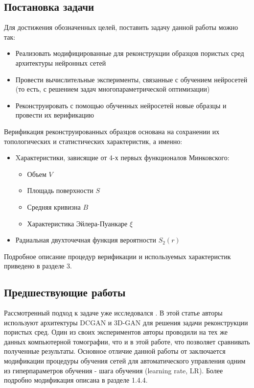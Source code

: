 	\subsection*{Постановка задачи}
	
	Для достижения обозначенных целей, поставить задачу данной работы можно так:
	
	\begin{itemize}
		\item Реализовать модифицированные для реконструкции образцов пористых сред архитектуры нейронных сетей
		\item Провести вычислительные эксперименты, связанные с обучением нейросетей (то есть, с решением задач многопараметрической оптимизации)
		\item Реконструировать с помощью обученных нейросетей новые образцы и провести их верификацию
	\end{itemize}

	Верификация реконструированных образцов основана на сохранении их топологических и статистических характеристик, а именно:
	
	\begin{itemize}
		\item Xарактеристики, зависящие от 4-х первых функционалов Минковского:
		\begin{itemize}
			\item Объем $V$
			\item Площадь поверхности $S$
			\item Средняя кривизна $B$
			\item Характеристика Эйлера-Пуанкаре $\xi$
		\end{itemize}
		\item Радиальная двухточечная функция вероятности $S_2(r)$
	\end{itemize}

	Подробное описание процедур верификации и используемых характеристик приведено в разделе 3.
	
	\subsection*{Предшествующие работы}
		Рассмотренный подход к задаче уже исследовался \cite{Mosser}. В этой статье авторы используют архитектуры DCGAN \cite{Radford} и 3D-GAN \cite{Wu} для решения задачи реконструкции пористых сред. Один из своих экспериментов авторы проводили на тех же данных компьютерной томографии, что и в этой работе, что позволяет сравнивать полученные результаты. Основное отличие данной работы от \cite{Mosser} заключается модификации процедуры обучения сетей для автоматического управления одним из гиперпараметров обучения - шага обучения (learning rate, LR). Более подробно модификация описана в разделе 1.4.4.